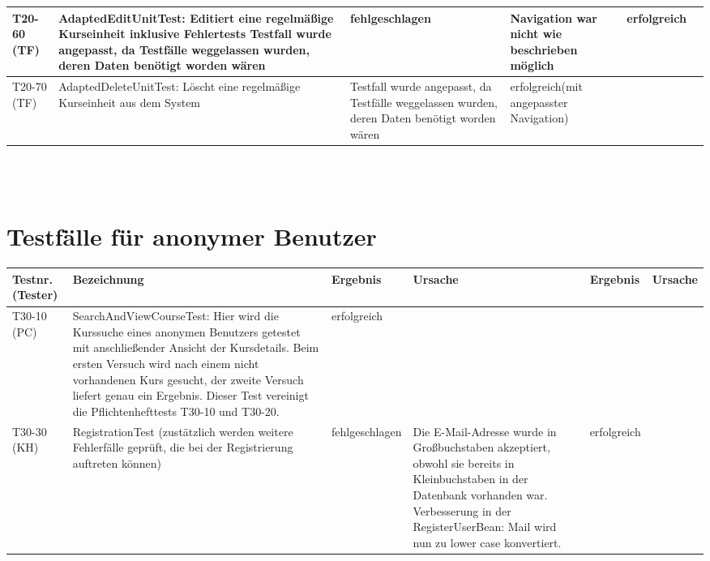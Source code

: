 \begin{landscape}
\begin{tabular}{|p{2.0cm} |p{5.0cm}|p{3.0cm}|p{5.0cm}|p{4.0cm}|p{4.0cm}|}
			\hline  T20-60 (TF)     & AdaptedEditUnitTest: Editiert eine regelmäßige Kurseinheit inklusive Fehlertests 
			Testfall wurde angepasst, da Testfälle weggelassen wurden, deren Daten benötigt worden wären &   fehlgeschlagen      
			& Navigation war nicht wie beschrieben möglich
			&  erfolgreich       &     \\
						
			\hline  T20-70 (TF)     & AdaptedDeleteUnitTest: Löscht eine regelmäßige Kurseinheit aus dem System
			& Testfall wurde angepasst, da Testfälle weggelassen wurden, deren Daten benötigt worden wären			
			& erfolgreich(mit angepasster Navigation)     
			& 
			&     \\
			\hline 
		\end{tabular} \ \\
		\ \\
				
	\section{Testfälle für anonymer Benutzer}
		\begin{tabular}{|p{2.0cm} |p{5.0cm}|p{3.0cm}|p{5.0cm}|p{4.0cm}|p{4.0cm}|}
			\hline \textbf{Testnr. (Tester)} & \textbf{Bezeichnung} & \textbf{Ergebnis} & \textbf{Ursache} & \textbf{Ergebnis} & \textbf{Ursache} \\
			
			\hline   T30-10  (PC) &	SearchAndViewCourseTest: Hier wird die Kurssuche eines anonymen Benutzers getestet mit anschließender Ansicht der Kursdetails. Beim ersten Versuch wird nach einem nicht vorhandenen Kurs gesucht, der zweite Versuch liefert genau ein Ergebnis. Dieser Test vereinigt die Pflichtenhefttests T30-10 und T30-20. & erfolgreich & & & \\	
			
			\hline   T30-30  (KH)  & RegistrationTest (zustätzlich werden weitere Fehlerfälle geprüft, die bei der Registrierung auftreten können)   &   fehlgeschlagen       &    Die E-Mail-Adresse wurde in Großbuchstaben akzeptiert, obwohl sie bereits in Kleinbuchstaben in der Datenbank vorhanden war. Verbesserung in der RegisterUserBean: Mail wird nun zu lower case konvertiert.    &    erfolgreich     &       \\
			
			\hline 
		\end{tabular}
		
			

\end{landscape}
